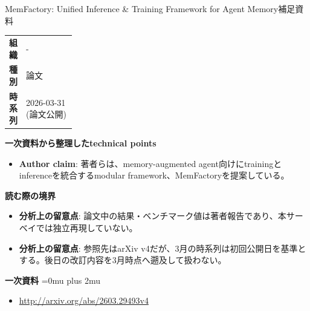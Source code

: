 \begin{technicalnote}{MemFactory: Unified Inference \& Training Framework for Agent Memory}{補足資料}
\begingroup
\begin{tabularx}{\linewidth}{@{}>{\bfseries}p{0.22\linewidth}X@{}}
組織 & - \\
種別 & 論文 \\
時系列 & 2026-03-31 (論文公開) \\
\end{tabularx}
\smallskip
{\bfseries 一次資料から整理したtechnical points}
\begin{itemize}[leftmargin=1.5em,itemsep=0.35em]
\item \textbf{Author claim}: 著者らは、memory-augmented agent向けにtrainingとinferenceを統合するmodular framework、MemFactoryを提案している。
\end{itemize}
\begin{minipage}{\linewidth}
{\bfseries 読む際の境界}
\begin{itemize}[leftmargin=1.5em,itemsep=0.35em]
\item \textbf{分析上の留意点}: 論文中の結果・ベンチマーク値は著者報告であり、本サーベイでは独立再現していない。
\item \textbf{分析上の留意点}: 参照先はarXiv v4だが、3月の時系列は初回公開日を基準とする。後日の改訂内容を3月時点へ遡及して扱わない。
\end{itemize}
\begin{samepage}
{\bfseries 一次資料}
\begingroup\sloppy
\Urlmuskip=0mu plus 2mu\relax
\begin{itemize}[leftmargin=1.5em,itemsep=0.25em]
\item {\scriptsize\url{http://arxiv.org/abs/2603.29493v4}}
\end{itemize}
\endgroup
\end{samepage}
\end{minipage}
\endgroup
\end{technicalnote}
\medskip
